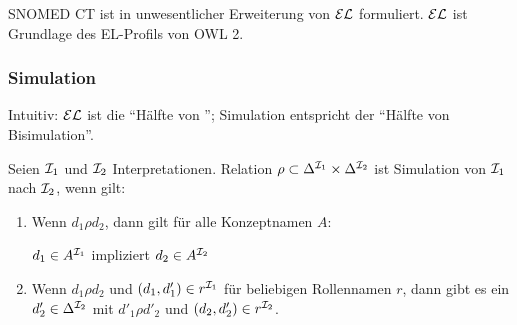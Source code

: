 SNOMED CT ist in unwesentlicher Erweiterung von $\mathcal{E}\mathcal{L}$ formuliert. $\mathcal{E}\mathcal{L}$ ist Grundlage des EL-Profils von OWL 2.

\subsubsection{Simulation}\label{simulation}

Intuitiv: $\mathcal{E}\mathcal{L}$ ist die \enquote{Hälfte von \ALC}; Simulation entspricht der \enquote{Hälfte von Bisimulation}.

\begin{definition}[Simulation]
    Seien $\mathcal{I}_1$ und $\mathcal{I}_2$ Interpretationen. Relation $\rho \subset \Delta^{\mathcal{I}_1} \times \Delta^{\mathcal{I}_2}$ ist Simulation von $\mathcal{I}_1$ nach $\mathcal{I}_2$, wenn gilt:
    \begin{enumerate}
        \item Wenn $d_1 \rho d_2$, dann gilt für alle Konzeptnamen $A$:
            \begin{center}
                $d_1 \in A^{\mathcal{I}_1}$ impliziert $d_2 \in A^{\mathcal{I}_2}$
            \end{center}
        \item Wenn $d_1 \rho d_2$ und $(d_1, d'_1) \in r^{\mathcal{I}_1}$ für beliebigen Rollennamen $r$, dann gibt es ein $d'_2 \in \Delta^{\mathcal{I}_2}$ mit $d'_1 \rho d'_2$ und $(d_2, d'_2) \in r^{\mathcal{I}_2}$.
    \end{enumerate}
\end{definition}

